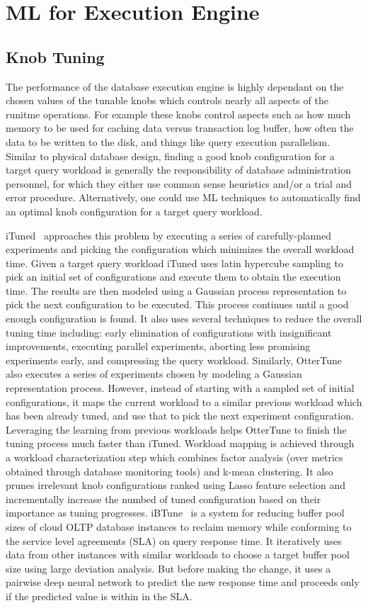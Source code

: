 \section{ML for Execution Engine}


\subsection{Knob Tuning}
The performance of the database execution engine is highly dependant on the chosen values of the tunable knobs which controls nearly all aspects of the runitme operations.
For example these knobs control aspects such as how much memory to be used for caching data versus transaction log buffer, how often the data to be written to the disk, and things like query execution parallelism.
Similar to physical database design, finding a good knob configuration for a target query workload is generally the responsibility of database administration personnel, for which they either use common sense heuristics and/or a trial and error procedure.
Alternatively, one could use ML techniques to automatically find an optimal knob configuration for a target query workload.

iTuned~\cite{ituned} approaches this problem by executing a series of carefully-planned experiments and picking the configuration which minimizes the overall workload time.
Given a target query workload iTuned uses latin hypercube sampling to pick an initial set of configurations and execute them to obtain the execution time.
The results are then modeled using a Gaussian process representation to pick the next configuration to be executed.
This process continues until a good enough configuration is found.
It also uses several techniques to reduce the overall tuning time including: early elimination of configurations with insignificant improvements, executing parallel experiments, aborting less promising experiments early, and compressing the query workload.
Similarly, OtterTune~\cite{ottertune} also executes a series of experiments chosen by modeling a Gaussian representation process.
However, instead of starting with a sampled set of initial configurations, it maps the current workload to a similar previous workload which has been already tuned, and use that to pick the next experiment configuration.
Leveraging the learning from previous workloads helps OtterTune to finish the tuning process much faster than iTuned.
Workload mapping is achieved through a workload characterization step which combines factor analysis (over metrics obtained through database monitoring tools) and k-mean clustering.
It also prunes irrelevant knob configurations ranked using Lasso feature selection and incrementally increase the numbed of tuned configuration based on their importance as tuning progresses.
iBTune~\cite{ibtune} is a system for reducing buffer pool sizes of cloud OLTP database instances to reclaim memory while conforming to the service level agreements (SLA) on query response time.
It iteratively uses data from other instances with similar workloads to choose a target buffer pool size using large deviation analysis.
But before making the change, it uses a pairwise deep neural network to predict the new response time and proceeds only if the predicted value is within in the SLA.

